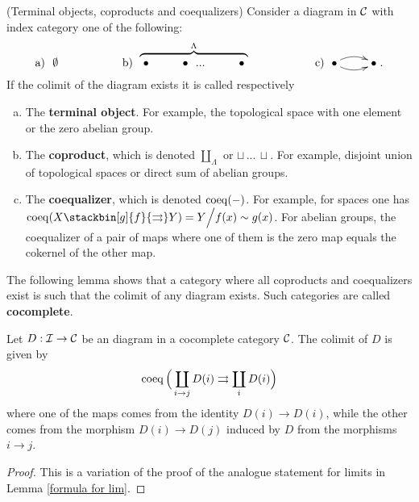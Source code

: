 \documentclass[thesis.tex]{subfiles}
\begin{document}
\begin{example}(Terminal objects, coproducts and coequalizers) \label{coproducts and coequalizers}
Consider a diagram in $\operatorname{\mathcal{C}}$ with index category one of the following:
$$\text{a)} \ \ \emptyset \hspace*{2cm} \text{b)}\ \stackrel{\Lambda}{\overbrace{\xymatrix{\bullet &\bullet \ \ ... &\bullet}}} \hspace*{2cm} \text{c)}\ \xymatrix{\bullet\ar@/^/[r]\ar@/_/[r] & \bullet}.$$
If the colimit of the diagram exists it is called respectively
\begin{enumerate}[a)]
\item The \textbf{terminal object}. For example, the topological space with one element or the zero abelian group.
\item The \textbf{coproduct}, which is denoted $\coprod_\Lambda$ or $\sqcup\, ...\, \sqcup$. For example, disjoint union of topological spaces or direct sum of abelian groups.
\item The \textbf{coequalizer}, which is denoted $\operatorname{coeq}(-)$. For example, for spaces one has $\coeq(X\stackbin[g]{f}{\rightrightarrows}Y)=Y\Big/f(x)\sim g(x)$. For abelian groups, the coequalizer of a pair of maps where one of them is the zero map equals the cokernel of the other map.
\end{enumerate}
\end{example}

The following lemma shows that a category where all coproducts and coequalizers exist is such that the colimit of any diagram exists. Such categories are called \textbf{cocomplete}.

\begin{lemma}\label{formula for colim}
Let $D:\operatorname{\mathcal{I}}\to\operatorname{\mathcal{C}}$ be an diagram in a cocomplete category $\operatorname{\mathcal{C}}$. The colimit of $D$ is given by $$\operatorname{coeq}\Big(\coprod_{i\to j}D(i)\rightrightarrows\coprod_{i}D(i)\Big)$$
where one of the maps comes from the identity $D(i)\to D(i)$, while the other comes from the morphism $D(i)\to D(j)$ induced by $D$ from the morphisms $i\to j$.
\begin{proof}
This is a variation of the proof of the analogue statement for limits in Lemma \ref{formula for lim}.
\end{proof}
\end{lemma}
\end{document}
